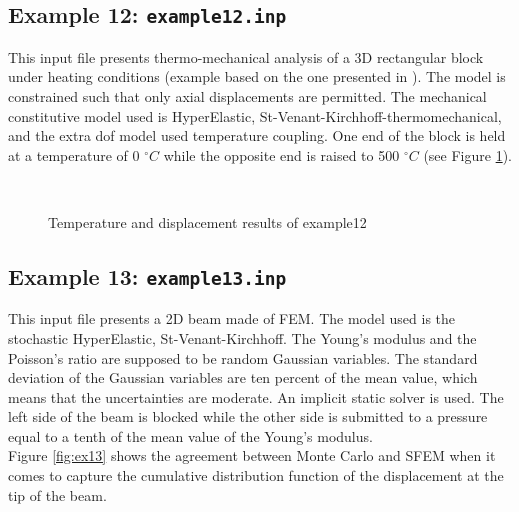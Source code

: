 \documentclass[oneside,11pt,times]{book}
\begin{document}
\subsection{Example 12: \texttt{example12.inp}}
This input file presents thermo-mechanical analysis of a 3D rectangular block under heating conditions (example based on the one presented in  \cite{NOVASCONE2015910}). The model is constrained such that only axial displacements are permitted.
The mechanical constitutive model used is HyperElastic, St-Venant-Kirchhoff-thermomechanical, and the extra dof model used temperature coupling. One end of the block is held at a temperature of 0 $^{\circ}C$  while the opposite end is raised to 500 $^{\circ}C$ (see Figure \ref{ex12}).
\begin{figure}[H]
  \begin{center}
    \mbox{
      \quad
       }
    \caption{Temperature and displacement results of example12}
    \label{ex12}
  \end{center}
\end{figure}

\newpage
\subsection{Example 13: \texttt{example13.inp}}
This input file presents a 2D beam made of FEM. The model used is the stochastic HyperElastic, St-Venant-Kirchhoff. The Young's modulus and the Poisson's ratio are supposed to be random Gaussian variables. The standard deviation of the Gaussian variables are ten percent of the mean value, which means that the uncertainties are moderate. An implicit static solver is used.
The left side of the beam is blocked while the other side is submitted to a pressure equal to a tenth of the mean value of the Young's modulus. \\
Figure \ref{fig:ex13} shows the agreement between Monte Carlo and SFEM when it comes to capture the cumulative distribution function of the displacement at the tip of the beam.
\end{document}
